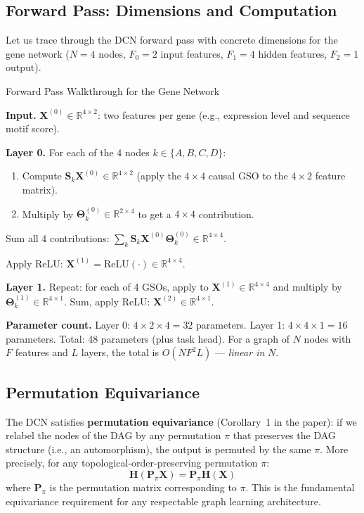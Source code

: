 \subsection{Forward Pass: Dimensions and Computation}

Let us trace through the DCN forward pass with concrete dimensions for the gene
network ($N=4$ nodes, $F_0=2$ input features, $F_1=4$ hidden features,
$F_2=1$ output).

\begin{examplebox}{Forward Pass Walkthrough for the Gene Network}

\textbf{Input.} $\mathbf{X}^{(0)} \in \mathbb{R}^{4 \times 2}$: two features
per gene (e.g., expression level and sequence motif score).

\textbf{Layer 0.} For each of the 4 nodes $k \in \{A, B, C, D\}$:
\begin{enumerate}[noitemsep]
    \item Compute $\mathbf{S}_k \mathbf{X}^{(0)} \in \mathbb{R}^{4 \times 2}$
          (apply the $4 \times 4$ causal GSO to the $4 \times 2$ feature matrix).
    \item Multiply by $\boldsymbol{\Theta}_k^{(0)} \in \mathbb{R}^{2 \times 4}$
          to get a $4 \times 4$ contribution.
\end{enumerate}
Sum all 4 contributions: $\sum_k \mathbf{S}_k \mathbf{X}^{(0)} \boldsymbol{\Theta}_k^{(0)}
\in \mathbb{R}^{4 \times 4}$.

Apply ReLU: $\mathbf{X}^{(1)} = \text{ReLU}(\cdot) \in \mathbb{R}^{4 \times 4}$.

\textbf{Layer 1.} Repeat: for each of 4 GSOs, apply to $\mathbf{X}^{(1)} \in
\mathbb{R}^{4 \times 4}$ and multiply by $\boldsymbol{\Theta}_k^{(1)} \in
\mathbb{R}^{4 \times 1}$. Sum, apply ReLU:
$\mathbf{X}^{(2)} \in \mathbb{R}^{4 \times 1}$.

\textbf{Parameter count.} Layer 0: $4 \times 2 \times 4 = 32$ parameters.
Layer 1: $4 \times 4 \times 1 = 16$ parameters. Total: 48 parameters (plus
task head). For a graph of $N$ nodes with $F$ features and $L$ layers, the
total is $O(N F^2 L)$ --- \emph{linear in} $N$.
\end{examplebox}

\subsection{Permutation Equivariance}

The DCN satisfies \textbf{permutation equivariance} (Corollary~1 in the paper):
if we relabel the nodes of the DAG by any permutation $\pi$ that preserves the
DAG structure (i.e., an automorphism), the output is permuted by the same
$\pi$. More precisely, for any topological-order-preserving permutation $\pi$:
\[
    \mathbf{H}(\mathbf{P}_\pi \mathbf{X}) = \mathbf{P}_\pi \mathbf{H}(\mathbf{X})
\]
where $\mathbf{P}_\pi$ is the permutation matrix corresponding to $\pi$. This
is the fundamental equivariance requirement for any respectable graph learning
architecture.

